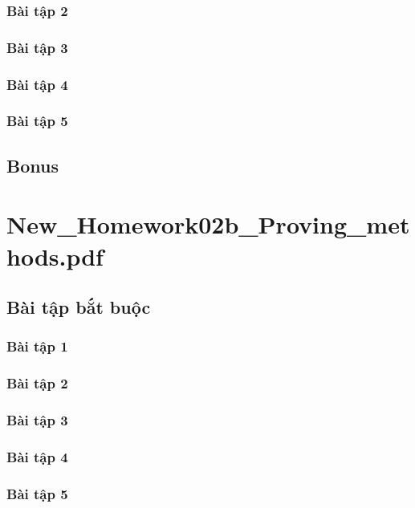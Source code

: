 \documentclass[a4paper]{article}
\begin{document}
\clearpage
\subsubsection{Bài tập 2}

\clearpage
\subsubsection{Bài tập 3}

\clearpage
\subsubsection{Bài tập 4}

\clearpage
\subsubsection{Bài tập 5}

\clearpage

\subsection{Bonus}
\clearpage

\section{New\_Homework02b\_Proving\_methods.pdf}
\subsection{Bài tập bắt buộc}
\subsubsection{Bài tập 1}

\clearpage
\subsubsection{Bài tập 2}

\clearpage
\subsubsection{Bài tập 3}

\clearpage
\subsubsection{Bài tập 4}

\clearpage
\subsubsection{Bài tập 5}
\end{document}
